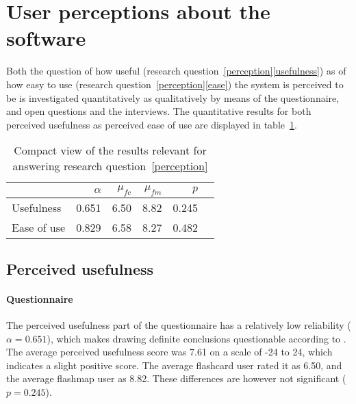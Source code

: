 \section{User perceptions about the software}

Both the question of how useful (research question~\ref{perception}\ref{usefulness}) as of how easy to use (research question~\ref{perception}\ref{ease}) the system is perceived to be is investigated quantitatively as qualitatively by means of the questionnaire, and open questions and the interviews. The quantitative results for both perceived usefulness as perceived ease of use are displayed in table~\ref{tab:perception}.

\begin{table}
    \centering
    \begin{tabular}{lrrrrr}
        \toprule
        & $\alpha$ & $\mu_{fc}$ & $\mu_{fm}$ & $p$ \\
        \midrule
        Usefulness & 0.651 & 6.50 & 8.82 & 0.245 \\
        Ease of use & 0.829 & 6.58 & 8.27 & 0.482 \\
        \bottomrule
    \end{tabular}
    \caption{Compact view of the results relevant for answering research question~\protect\ref{perception}}
    \label{tab:perception}
\end{table}

\subsection{Perceived usefulness}

\paragraph{Questionnaire} The perceived usefulness part of the questionnaire has a relatively low reliability ($\alpha=0.651$), which makes drawing definite conclusions questionable according to . The average perceived usefulness score was 7.61 on a scale of -24 to 24, which indicates a slight positive score. The average flashcard user rated it as 6.50, and the average flashmap user as 8.82. These differences are however not significant ($p=0.245$).


